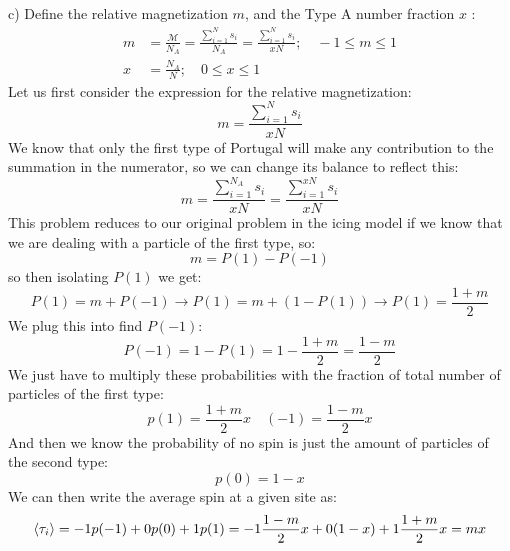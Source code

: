 \documentclass[12pt]{article}
\begin{document}
\subsection{}
c) Define the relative magnetization $m$, and the Type A number fraction $x$ :
\begin{align*}
m & =\frac{\mathcal{M}}{N_{A}}=\frac{\sum_{i=1}^{N} s_{i}}{N_{A}}=\frac{\sum_{i=1}^{N} s_{i}}{x N} ; \quad-1 \leq m \leq 1  \tag{1}\\
x & =\frac{N_{A}}{N} ; \quad 0 \leq x \leq 1 \tag{2}
\end{align*}
Let us first consider the expression for the relative magnetization:
\begin{equation}
  m =\frac{\sum_{i=1}^{N} s_{i}}{x N} 
\end{equation}
We know that only the first type of Portugal will make any contribution to the summation in the numerator, so we can change its balance to reflect this:
\begin{equation}
  m =\frac{\sum_{i=1}^{N_{A}} s_{i}}{x N} = \frac{\sum_{i=1}^{xN} s_{i}}{x N}
\end{equation}
This problem reduces to our original problem in the icing model if we know that we are dealing with a particle of the first type, so:
\begin{equation}
  m = P(1) - P(-1)
\end{equation}
so then isolating $P(1)$ we get:
\begin{equation}
  P(1) = m + P(-1) \rightarrow P(1) = m + (1 - P(1)) \rightarrow P(1) = \frac{1 + m}{2}
\end{equation}
We plug this into find $P(-1)$:
\begin{equation}
  P(-1) = 1 - P(1) = 1 - \frac{1 + m}{2} = \frac{1 - m}{2}
\end{equation}
We just have to multiply these probabilities with the fraction of total number of particles of the first type:
\begin{equation}
  p(1) = \frac{1 + m}{2}x \quad (-1) = \frac{1 - m}{2}x
\end{equation}
And then we know the probability of no spin is just the amount of particles of the second type:
\begin{equation}
  p(0) = 1 - x
\end{equation}
We can then write the average spin at a given site as:
\begin{equation}
  \expval{\tau_{i}} = -1p(-1) + 0p(0) + 1p(1) = -1\frac{1 - m}{2}x + 0(1 - x) + 1\frac{1 + m}{2}x = m x
\end{equation} 
\end{document}
